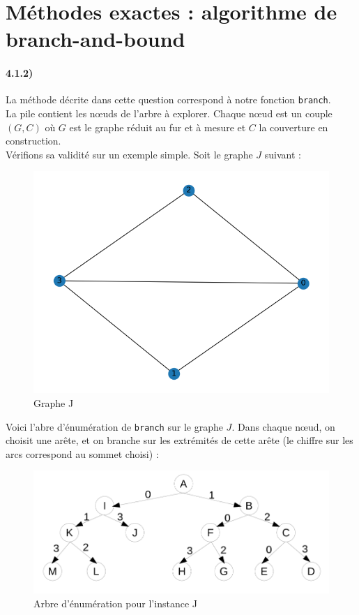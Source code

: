 \documentclass[12pt]{article}
\begin{document}
\section{Méthodes exactes : algorithme de branch-and-bound}

    \paragraph{4.1.2)}
        La méthode décrite dans cette question correspond à notre fonction \texttt{branch}. \\
        La pile contient les nœuds de l'arbre à explorer. Chaque nœud est un couple $(G,C)$ où $G$ est le graphe réduit au fur et à mesure et $C$ la couverture en construction. \\
        Vérifions sa validité sur un exemple simple. Soit le graphe $J$ suivant :

        \begin{figure}[H]
            \caption{Graphe J}
            \includegraphics[scale=0.5]{figures/Figure_1.png}
            \centering
        \end{figure}

        Voici l'abre d'énumération de \texttt{branch} sur le graphe $J$. Dans chaque nœud, on choisit une arête, et on branche sur les extrémités de cette arête (le chiffre sur les arcs correspond au sommet choisi) :

        \begin{figure}[H]
            \caption{Arbre d'énumération pour l'instance J}
            \includegraphics[scale=0.4]{figures/arbre_enum.png}
            \centering
        \end{figure}
\end{document}
